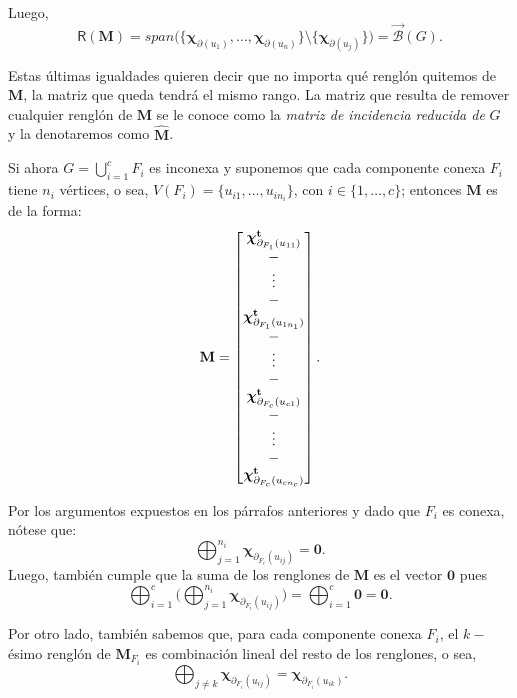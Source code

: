 Luego, 
$$
\mathsf{R}(\mathbf{M}) = span \Big (\{ \boldsymbol{\chi}_{\partial(u_{1})}, \ldots, \boldsymbol{\chi}_{\partial(u_{n})} \} \setminus \{\boldsymbol{\chi}_{\partial(u_{j})} \} \Big) = \overrightarrow{\mathcal{B}}(G).
$$

Estas últimas igualdades quieren decir que no importa qué renglón quitemos de $\mathbf{M}$, la matriz que queda tendrá el mismo rango. La matriz que resulta de remover cualquier renglón de $\mathbf{M}$ se le conoce como la \textit{matriz de incidencia reducida de} $G$ y la denotaremos como $\widehat{\mathbf{M}}$.

Si ahora $G=\bigcup_{i=1}^{c} F_{i}$ es inconexa y suponemos que cada componente conexa $F_{i}$ tiene $n_{i}$ vértices, o sea, $V(F_{i}) = \{u_{i1}, \ldots, u_{in_{i}} \}$, con $i\in \{1, \ldots, c\}$; entonces $\mathbf{M}$ es de la forma:
$$\mathbf{M} = 
\begin{bmatrix}
\boldsymbol{\chi}_{\partial_{F_{1}}(u_{11})}^{\mathbf{t}}\\ 
\-- \\
\vdots \\
\-- \\
\boldsymbol{\chi}_{\partial_{F_{1}}(u_{1n_{1}})}^{\mathbf{t}}\\ 
\-- \\
\vdots \\
\-- \\
\boldsymbol{\chi}_{\partial_{F_{c}}(u_{c1})}^{\mathbf{t}}\\
\-- \\
\vdots \\
\-- \\
\boldsymbol{\chi}_{\partial_{F_{c}}(u_{cn_{c}})}^{\mathbf{t}}
\end{bmatrix}.
$$

Por los argumentos expuestos en los párrafos anteriores y dado que $F_{i}$ es conexa, nótese que:
$$
\bigoplus_{j=1}^{n_{i}} \boldsymbol{\chi}_{\partial_{F_{i}}(u_{ij})} = \mathbf{0}.
$$
Luego, también cumple que la suma de los renglones de $\mathbf{M}$ es el vector $\mathbf{0}$ pues
$$
    \bigoplus_{i=1}^{c} \Big(\bigoplus_{j=1}^{n_{i}} \boldsymbol{\chi}_{\partial_{F_{i}}(u_{ij})} \Big)= \bigoplus_{i=1}^{c} \mathbf{0} = \mathbf{0}.
$$

Por otro lado, también sabemos que, para cada componente conexa $F_{i}$, el $k-$ésimo renglón de $\mathbf{M}_{F_{i}}$ es combinación lineal del resto de los renglones, o sea, $$\bigoplus_{j\neq k} \boldsymbol{\chi}_{\partial_{F_{i}}(u_{ij})} = \boldsymbol{\chi}_{\partial_{F_{i}}(u_{ik})}.$$

